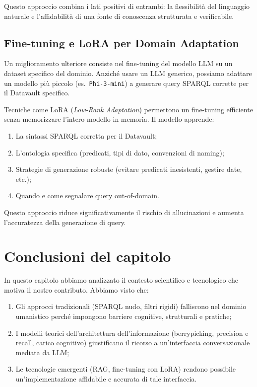 \documentclass[12pt,a4paper,oneside]{book}
\newcommand{\code}[1]{\colorbox{light-gray}{\texttt{#1}}}
\begin{document}
    Questo approccio combina i lati positivi di entrambi: la flessibilità del linguaggio naturale e l'affidabilità di una fonte di conoscenza strutturata e verificabile.

    \subsection{Fine-tuning e LoRA per Domain Adaptation}\label{subsec:finetune_lora}

    Un miglioramento ulteriore consiste nel fine-tuning del modello LLM su un dataset specifico del dominio. Anziché usare un LLM generico, possiamo adattare un modello più piccolo (es.\ \code{Phi-3-mini}) a generare query SPARQL corrette per il Datavault specifico.

    Tecniche come LoRA (\textit{Low-Rank Adaptation}) permettono un fine-tuning efficiente senza memorizzare l'intero modello in memoria. Il modello apprende:

    \begin{enumerate}
        \item La sintassi SPARQL corretta per il Datavault;
        \item L'ontologia specifica (predicati, tipi di dato, convenzioni di naming);
        \item Strategie di generazione robuste (evitare predicati inesistenti, gestire date, etc.);
        \item Quando e come segnalare query out-of-domain.
    \end{enumerate}

    Questo approccio riduce significativamente il rischio di allucinazioni e aumenta l'accuratezza della generazione di query.

\section{Conclusioni del capitolo}\label{sec:conclusioni_cap2}
In questo capitolo abbiamo analizzato il contesto scientifico e tecnologico che motiva il nostro contributo. Abbiamo visto che:
    \begin{enumerate}
        \item Gli approcci tradizionali (SPARQL nudo, filtri rigidi) falliscono nel dominio umanistico perché impongono barriere cognitive, strutturali e pratiche;
        \item I modelli teorici dell'architettura dell'informazione (berrypicking, precision e recall, carico cognitivo) giustificano il ricorso a un'interfaccia conversazionale mediata da LLM;\@
        \item Le tecnologie emergenti (RAG, fine-tuning con LoRA) rendono possibile un'implementazione affidabile e accurata di tale interfaccia.
    \end{enumerate}
\end{document}
